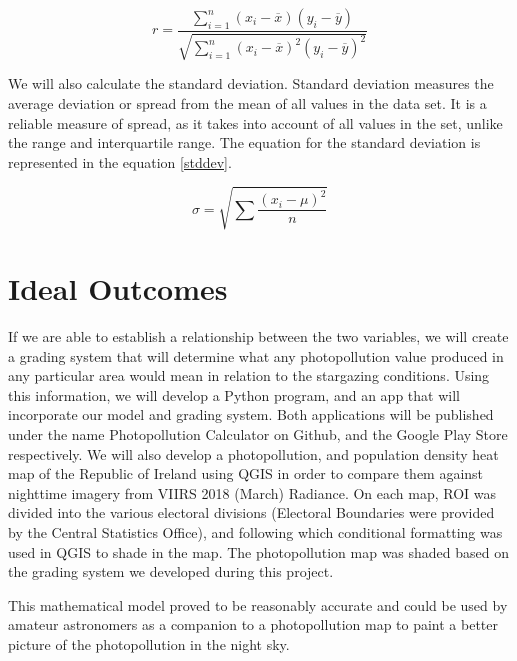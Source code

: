 \begin{equation}
\label{r}
r = \frac{{}\sum_{i=1}^{n} (x_i - \overline{x})(y_i - \overline{y})}{\sqrt{\sum_{i=1}^{n} (x_i - \overline{x})^2(y_i - \overline{y})^2}} 
\end{equation}

We will also calculate the standard deviation. Standard deviation measures the average deviation or spread from the mean of all values in the data set. It is a reliable measure of spread, as it takes into account of all values in the set, unlike the range and interquartile range.
The equation for the standard deviation is represented in the equation \ref{stddev}.\cite{am4}

\begin{equation}
\label{stddev}
\sigma = \sqrt{\sum \frac{(x_i - \mu)^2}{n}} 
\end{equation}

\section{Ideal Outcomes}
If we are able to establish a relationship between the two variables, we will create a grading system that will determine what any photopollution value produced in any particular area would mean in relation to the stargazing conditions. Using this information, we will develop a Python program, and an app that will incorporate our model and grading system. Both applications will be published under the name Photopollution Calculator on Github, and the Google Play Store respectively.\cite{github}\cite{play_store} We will also develop a photopollution, and population density heat map of the Republic of Ireland using QGIS in order to compare them against nighttime imagery from VIIRS 2018 (March) Radiance.\cite{QGIS_software}\cite{VIIRS_compare} On each map, ROI was divided into the various electoral divisions (Electoral Boundaries were provided by the Central Statistics Office), and following which conditional formatting was used in QGIS to shade in the map.\cite{boundaries} The photopollution map was shaded based on the grading system we developed during this project.

This mathematical model proved to be reasonably accurate and could be used by amateur astronomers as a companion to a photopollution map to paint a better picture of the photopollution in the night sky. 
